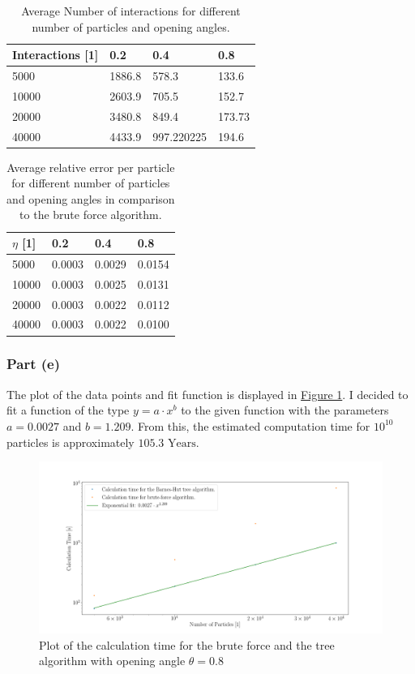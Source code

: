 \documentclass{scrartcl}
\begin{document}
\begin{table}[ht]
	\centering
	\begin{tabular}{|l|l|l|l|}
		\hline
		Interactions [1] & 0.2 & 0.4 & 0.8 \\ \hline
		5000        & 1886.8       	   & 578.3     	   & 133.6  \\ \hline
		10000       & 2603.9           & 705.5         & 152.7  \\ \hline
		20000       & 3480.8	       & 849.4         & 173.73 \\ \hline
		40000       & 4433.9           & 997.220225    & 194.6  \\ \hline
	\end{tabular}
	\caption{Average Number of interactions for different number of particles and opening angles.}
\end{table}

\begin{table}[ht]
	\centering
	\begin{tabular}{|l|l|l|l|}
		\hline
		\( \eta \) [1] & 0.2 & 0.4 & 0.8 \\ \hline
		5000        & 0.0003           & 0.0029        & 0.0154   \\ \hline
		10000       & 0.0003           & 0.0025        & 0.0131   \\ \hline
		20000       & 0.0003           & 0.0022        & 0.0112   \\ \hline
		40000       & 0.0003           & 0.0022        & 0.0100   \\ \hline
	\end{tabular}
	\caption{Average relative error per particle for different number of particles and opening angles in comparison to the brute force algorithm.}
\end{table}
\newpage
\subsubsection*{Part (e)}
The plot of the data points and fit function is displayed in \href{fig:calctime}{Figure 1}. I decided to fit a function of the type \( y = a \cdot x^b \) to the given function  with the parameters \( a = 0.0027\) and \( b = 1.209 \). From this, the estimated computation time for \( 10^{10} \) particles is approximately \( 105.3\text{ Years} \).
\begin{figure}
	\centering
	\includegraphics[width=1.0\linewidth]{CalcTime}
	\caption{Plot of the calculation time for the brute force and the tree algorithm with opening angle \( \theta = 0.8\)}
	\label{fig:calctime}
\end{figure}
\end{document}
